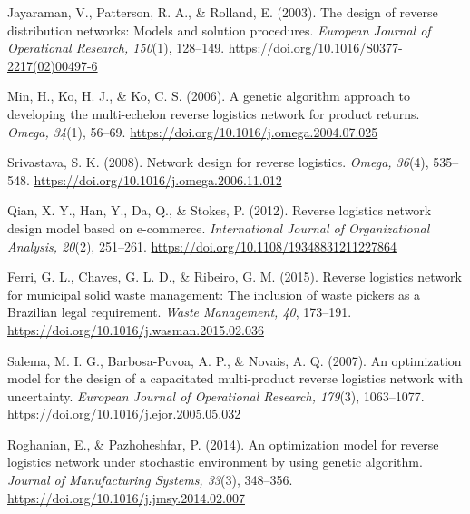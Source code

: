 \newpage %

\begin{thebibliography}{99} %

Jayaraman, V., Patterson, R. A., \& Rolland, E. (2003). The design of reverse distribution networks: Models and solution procedures. \textit{European Journal of Operational Research, 150}(1), 128--149. \href{https://doi.org/10.1016/S0377-2217(02)00497-6}{https://doi.org/10.1016/S0377-2217(02)00497-6}

Min, H., Ko, H. J., \& Ko, C. S. (2006). A genetic algorithm approach to developing the multi-echelon reverse logistics network for product returns. \textit{Omega, 34}(1), 56--69. \href{https://doi.org/10.1016/j.omega.2004.07.025}{https://doi.org/10.1016/j.omega.2004.07.025}

Srivastava, S. K. (2008). Network design for reverse logistics. \textit{Omega, 36}(4), 535--548. \href{https://doi.org/10.1016/j.omega.2006.11.012}{https://doi.org/10.1016/j.omega.2006.11.012}

Qian, X. Y., Han, Y., Da, Q., \& Stokes, P. (2012). Reverse logistics network design model based on e-commerce. \textit{International Journal of Organizational Analysis, 20}(2), 251--261. \href{https://doi.org/10.1108/19348831211227864}{https://doi.org/10.1108/19348831211227864}

Ferri, G. L., Chaves, G. L. D., \& Ribeiro, G. M. (2015). Reverse logistics network for municipal solid waste management: The inclusion of waste pickers as a Brazilian legal requirement. \textit{Waste Management, 40}, 173--191. \href{https://doi.org/10.1016/j.wasman.2015.02.036}{https://doi.org/10.1016/j.wasman.2015.02.036}

Salema, M. I. G., Barbosa-Povoa, A. P., \& Novais, A. Q. (2007). An optimization model for the design of a capacitated multi-product reverse logistics network with uncertainty. \textit{European Journal of Operational Research, 179}(3), 1063--1077. \href{https://doi.org/10.1016/j.ejor.2005.05.032}{https://doi.org/10.1016/j.ejor.2005.05.032}

Roghanian, E., \& Pazhoheshfar, P. (2014). An optimization model for reverse logistics network under stochastic environment by using genetic algorithm. \textit{Journal of Manufacturing Systems, 33}(3), 348--356. \href{https://doi.org/10.1016/j.jmsy.2014.02.007}{https://doi.org/10.1016/j.jmsy.2014.02.007}


\end{thebibliography}
